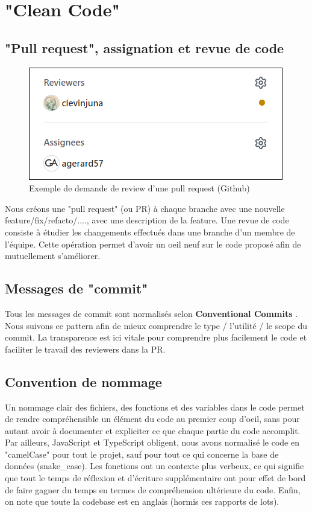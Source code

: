 \section{"Clean Code"}

\subsection{"Pull request", assignation et revue de code}
\begin{figure}[th]
\centering
\includegraphics[scale=0.6]{medias/Code_Review_Image.png}
\decoRule
\caption{Exemple de demande de review d'une pull request (Github)}
\end{figure}

Nous créons une "pull request" (ou PR) à chaque branche avec une nouvelle feature/fix/refacto/...., avec une description de la feature.
Une revue de code consiste à étudier les changements effectués dans une branche d'un membre de l'équipe. Cette opération permet d'avoir un oeil neuf sur le code proposé afin de mutuellement s'améliorer.

\subsection{Messages de "commit"}

Tous les messages de commit sont normalisés selon \textbf{Conventional Commits} \parencite{Ref2}. Nous suivons ce pattern afin de mieux comprendre le type / l'utilité / le scope du commit. La transparence est ici vitale pour comprendre plus facilement le code et faciliter le travail des reviewers dans la PR.

\subsection{Convention de nommage}

Un nommage clair des fichiers, des fonctions et des variables dans le code permet de rendre compréhensible un élément du code au premier coup d'oeil, sans pour autant avoir à documenter et expliciter ce que chaque partie du code accomplit.
Par ailleurs, JavaScript et TypeScript obligent, nous avons normalisé le code en "camelCase" pour tout le projet, sauf pour tout ce qui concerne la base de données (snake\_case). Les fonctions ont un contexte plus verbeux, ce qui signifie que tout le temps de réflexion et d'écriture supplémentaire ont pour effet de bord de faire gagner du temps en termes de compréhension ultérieure du code. Enfin, on note que toute la codebase est en anglais (hormis ces rapports de lots). 

